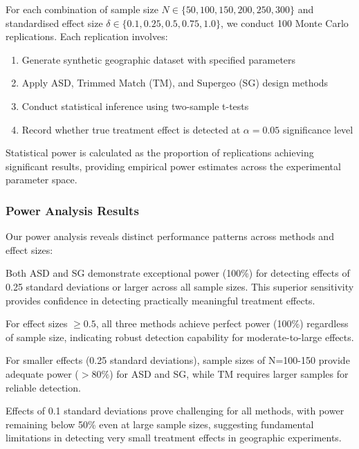 \documentclass[final,3p,fleqn, 10pt]{elsarticle}
\begin{document}
For each combination of sample size $N \in \{50, 100, 150, 200, 250, 300\}$ and standardised effect size $\delta \in \{0.1, 0.25, 0.5, 0.75, 1.0\}$, we conduct 100 Monte Carlo replications. Each replication involves:

\begin{enumerate}
    \item Generate synthetic geographic dataset with specified parameters
    \item Apply ASD, Trimmed Match (TM), and Supergeo (SG) design methods
    \item Conduct statistical inference using two-sample t-tests
    \item Record whether true treatment effect is detected at $\alpha = 0.05$ significance level
\end{enumerate}

Statistical power is calculated as the proportion of replications achieving significant results, providing empirical power estimates across the experimental parameter space.

\subsubsection{Power Analysis Results}

Our power analysis reveals distinct performance patterns across methods and effect sizes:

Both ASD and SG demonstrate exceptional power (100\%) for detecting effects of 0.25 standard deviations or larger across all sample sizes. This superior sensitivity provides confidence in detecting practically meaningful treatment effects.

For effect sizes $\geq 0.5$, all three methods achieve perfect power (100\%) regardless of sample size, indicating robust detection capability for moderate-to-large effects.

For smaller effects (0.25 standard deviations), sample sizes of N=100-150 provide adequate power ($>80\%$) for ASD and SG, while TM requires larger samples for reliable detection.

Effects of 0.1 standard deviations prove challenging for all methods, with power remaining below 50\% even at large sample sizes, suggesting fundamental limitations in detecting very small treatment effects in geographic experiments.
\end{document}
